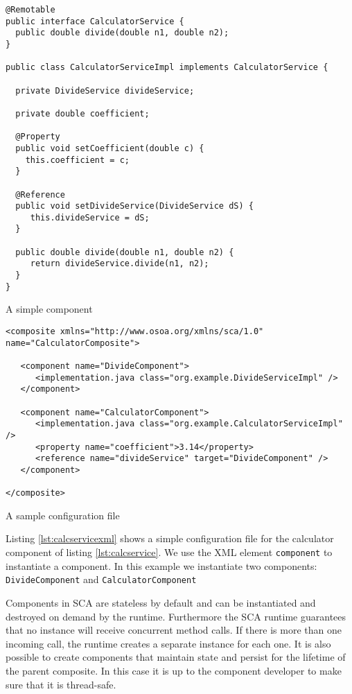 \begin{listing}
\begin{verbatim}
@Remotable
public interface CalculatorService {
  public double divide(double n1, double n2);
}

public class CalculatorServiceImpl implements CalculatorService {

  private DivideService divideService;
  
  private double coefficient;
  
  @Property
  public void setCoefficient(double c) {
    this.coefficient = c;
  }

  @Reference
  public void setDivideService(DivideService dS) {
     this.divideService = dS;
  }

  public double divide(double n1, double n2) {
     return divideService.divide(n1, n2);
  }
}
\end{verbatim}
\caption{A simple component}
\label{lst:calcservice}
\end{listing}
\begin{listing}
\begin{verbatim}
<composite xmlns="http://www.osoa.org/xmlns/sca/1.0" name="CalculatorComposite">

   <component name="DivideComponent">
      <implementation.java class="org.example.DivideServiceImpl" />
   </component>

   <component name="CalculatorComponent">
      <implementation.java class="org.example.CalculatorServiceImpl" />
      <property name="coefficient">3.14</property>
      <reference name="divideService" target="DivideComponent" />
   </component>

</composite>
\end{verbatim}
\caption{A sample configuration file}
\label{lst:calcservicexml}
\end{listing}

Listing \ref{lst:calcservicexml} shows a simple configuration file for the calculator component of listing \ref{lst:calcservice}.
We use the XML element \texttt{component} to instantiate a component. In this example we instantiate two components:
\texttt{DivideComponent} and \texttt{CalculatorComponent}

Components in SCA are stateless by default and can be instantiated and destroyed on demand by the runtime. Furthermore the
SCA runtime guarantees that no instance will receive concurrent method calls. If there is more than one incoming call, the
runtime creates a separate instance for each one. It is also possible to create components that maintain state and persist
for the lifetime of the parent composite. In this case it is up to the component developer to make sure that it is thread-safe.

